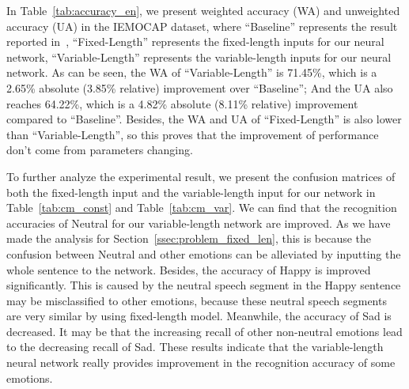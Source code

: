 \documentclass[a4paper]{article}
\begin{document}
In Table~\ref{tab:accuracy_en}, we present weighted accuracy (WA) and unweighted accuracy (UA) in the IEMOCAP dataset, where ``Baseline'' represents the result reported in~\cite{satt2017}, ``Fixed-Length'' represents the fixed-length inputs for our neural network, ``Variable-Length'' represents the variable-length inputs for our neural network. As can be seen, the WA of ``Variable-Length'' is 71.45\%, which is a 2.65\% absolute (3.85\% relative) improvement over ``Baseline''; And the UA also reaches 64.22\%, which is a 4.82\% absolute (8.11\% relative) improvement compared to ``Baseline''. Besides, the WA and UA of ``Fixed-Length'' is also lower than ``Variable-Length'', so this proves that the improvement of performance don't come from parameters changing.

To further analyze the experimental result, we present the confusion matrices of both the fixed-length input and the variable-length input for our network in Table~\ref{tab:cm_const} and Table~\ref{tab:cm_var}. We can find that the recognition accuracies of Neutral for our variable-length network are improved. As we have made the analysis for Section~\ref{ssec:problem_fixed_len}, this is because the confusion between Neutral and other emotions can be alleviated by inputting the whole sentence to the network. Besides, the accuracy of Happy is improved significantly. This is caused by the neutral speech segment in the Happy sentence may be misclassified to other emotions, because these neutral speech segments are very similar by using fixed-length model. Meanwhile, the accuracy of Sad is decreased. It may be that the increasing recall of other non-neutral emotions lead to the decreasing recall of Sad. These results indicate that the variable-length neural network really provides improvement in the recognition accuracy of some emotions.

\begin{table}[htb]
    \setlength{\abovecaptionskip}{0cm}
    \setlength{\belowcaptionskip}{-0.3cm}
    \caption{Comparison of weighted accuracy (WA) and unweighted accuracy (UA) on IEMOCAP dataset}
    \label{tab:accuracy_en}
\end{table}
\end{document}
